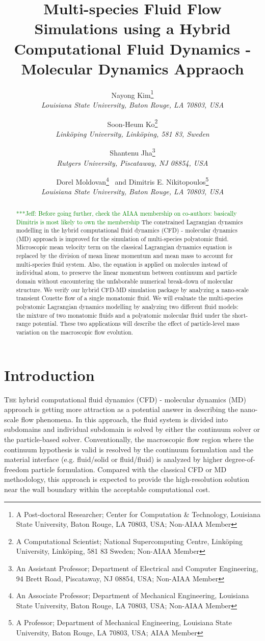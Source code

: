 \documentclass[]{aiaa-tc}%
\title{Multi-species Fluid Flow Simulations using a Hybrid Computational Fluid Dynamics - Molecular Dynamics Appraoch 
 \skonote{Or "Polyatomic Lagrangian Dynamics Modelling for a Hybrid Computational Fluid Dynamics - Molecular Dynamics Appraoch"} }
\author{
  Nayong Kim\thanks{A Post-doctoral Researcher; Center for Computation \& Technology,
  Louisiana State University, Baton Rouge, LA 70803, USA; Non-AIAA Member}\\
  {\normalsize\itshape
   Louisiana State University, Baton Rouge, LA 70803, USA}\\
  \and
  Soon-Heum Ko\thanks{A Computational Scientist; National Supercomputing Centre,
  Link\"{o}ping University, Link\"{o}ping, 581 83 Sweden; Non-AIAA Member}\\
  {\normalsize\itshape
   Link\"{o}ping University, Link\"{o}ping, 581 83, Sweden}\\
  \and
  Shantenu Jha\thanks{An Assistant Professor; Department of Electrical and Computer Engineering,
  94 Brett Road, Piscataway, NJ 08854, USA; Non-AIAA Member}\\
  {\normalsize\itshape
   Rutgers University, Piscataway, NJ 08854, USA}\\
  \and
  Dorel Moldovan\thanks{An Associate Professor; Department of Mechanical Engineering,
  Louisiana State University, Baton Rouge, LA 70803, USA; Non-AIAA Member}
    \ and
  Dimitris E. Nikitopoulos\thanks{A Professor; Department of Mechanical Engineering,
  Louisiana State University, Baton Rouge, LA 70803, USA; AIAA Member}\\
  {\normalsize\itshape
   Louisiana State University, Baton Rouge, LA 70803, USA}\\
 }
\newcommand{\skonote}[1]{ {\textcolor{green} { ***Jeff: #1 }}}
\begin{document}
\maketitle


\begin{abstract}
\skonote{Before going further, check the AIAA membership on co-authors: basically Dimitris is most likely to own the membership}
The constrained Lagrangian dynamics modelling in the hybrid computational fluid dynamics (CFD) - molecular dynamics (MD) approach is improved for the simulation of multi-species polyatomic fluid.
Microscopic mean velocity term on the classical Lagrangian dynamics equation is replaced by the division of mean linear momentum and mean mass to account for multi-species fluid system.
Also, the equation is applied on molecules instead of individual atom, to preserve the linear momentum between continuum and particle domain without encountering the unfaborable numerical break-down of molecular structure.
We verify our hybrid CFD-MD simulation package by analyzing a nano-scale transient Couette flow of a single monatomic fluid.
We will evaluate the multi-species polyatomic Lagrangian dynamics modelling by analyzing two different fluid models: the mixture of two monatomic fluids and a polyatomic molecular fluid under the short-range potential.
These two applications will describe the effect of particle-level mass variation on the macroscopic flow evolution.
\end{abstract}




\section{Introduction}
\label{sec:intro}

\lettrine[nindent=0pt]{T}{he} hybrid computational fluid dynamics (CFD) - 
molecular dynamics (MD) approach is getting more attraction as a potential 
answer in describing the nano-scale flow phenomena. In this approach,
the fluid system is divided into subdomains and individual subdomain is
solved by either the continuum solver or the particle-based solver.
Conventionally, the macroscopic flow region where the continuum hypothesis is
valid is resolved by the continuum formulation and the material interface 
(e.g. fluid/solid or fluid/fluid) is analyzed by higher degree-of-freedom 
particle formulation. Compared with the classical CFD or MD methodology, 
this approach is expected to provide the high-resolution solution near 
the wall boundary within the acceptable computational cost.
\end{document}
